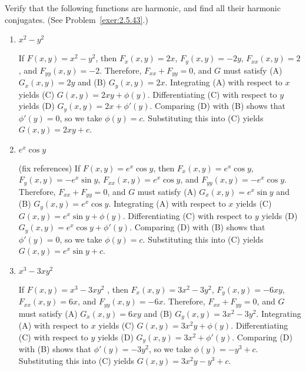\documentclass{ximera}
\begin{document}
\begin{problem}\label{exer:2.5.44}
Verify that the following functions are harmonic, and find all their harmonic conjugates.  (See Problem~\ref{exer:2.5.43}.)

\begin{enumerate}
    \item $x^2-y^2$

    

    \begin{solution}
        If $F(x,y)=x^2-y^2$, then $F_x(x,y)=2x$, $F_y(x,y)=-2y$,
$F_{xx}(x,y)=2$, and $F_{yy}(x,y)=-2$.
Therefore, $F_{xx}+F_{yy}=0$, and $G$ must satisfy
(A) $G_x(x,y)=2y$ and (B) $G_y(x,y)=2x$.
Integrating (A) with respect to $x$ yields
(C) $G(x,y)=2xy+\phi(y)$.
Differentiating
(C) with respect to
$y$ yields
(D) $G_y(x,y)=2x+\phi'(y)$.
Comparing (D) with (B)  shows that
$\phi'(y)=0$, so we take
$\phi(y)=c$.
Substituting this into (C) yields
$G(x,y)=2xy+c$.
    \end{solution}
    
    \item $e^x\cos y$

    

    \begin{solution} (fix references)
        If $F(x,y)=e^x\cos y$, then $F_x(x,y)=e^x\cos y$,
 $F_y(x,y)=-e^x\sin y$,
$F_{xx}(x,y)=e^x\cos y$, and $F_{yy}(x,y)=-e^x\cos y$.
Therefore, $F_{xx}+F_{yy}=0$, and $G$ must satisfy
(A) $G_x(x,y)=e^x\sin y$ and (B) $G_y(x,y)=e^x\cos y$.
Integrating (A) with respect to $x$ yields
(C) $G(x,y)=e^x\sin y+\phi(y)$.
Differentiating (C) with respect to $y$  yields
(D) $G_y(x,y)=e^x\cos y+\phi'(y)$.
Comparing (D) with (B)  shows that
$\phi'(y)=0$, so we take
$\phi(y)=c$.
Substituting this into (C) yields
$G(x,y)=e^x\sin y+c$.
    \end{solution}
    
    \item $x^3-3xy^2$

    

    \begin{solution}
        If $F(x,y)=x^3-3xy^2$ , then $F_x(x,y)=3x^2-3y^2$, $F_y(x,y)=-6xy$,
$F_{xx}(x,y)=6x$, and $F_{yy}(x,y)=-6x$.
Therefore, $F_{xx}+F_{yy}=0$, and $G$ must satisfy
(A) $G_x(x,y)=6xy$ and (B) $G_y(x,y)=3x^2-3y^2$.
Integrating (A) with respect to $x$ yields
(C) $G(x,y)=3x^2y+\phi(y)$.
Differentiating (C) with respect to $y$  yields
(D) $G_y(x,y)=3x^2+\phi'(y)$.
Comparing (D) with (B)  shows that
$\phi'(y)=-3y^2$, so we take
$\phi(y)=-y^3+c$.
Substituting this into (C) yields
$G(x,y)=3x^2y-y^3+c$.
    \end{solution}
    

\end{enumerate}
\end{problem}
\end{document}
